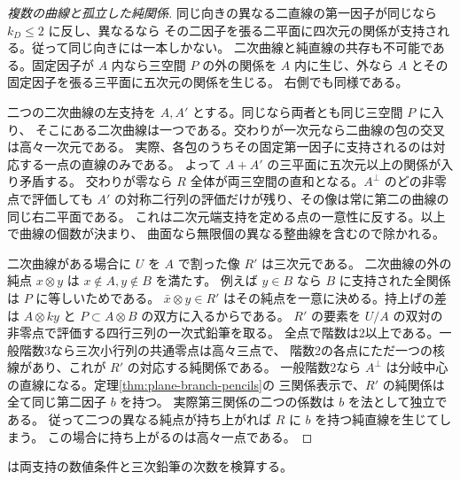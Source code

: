 \begin{proof}[複数の曲線と孤立した純関係]
同じ向きの異なる二直線の第一因子が同じなら $k_D\le2$ に反し、異なるなら
その二因子を張る二平面に四次元の関係が支持される。従って同じ向きには一本しかない。
二次曲線と純直線の共存も不可能である。固定因子が $A$ 内なら三空間 $P$ の外の関係を
$A$ 内に生じ、外なら $A$ とその固定因子を張る三平面に五次元の関係を生じる。
右側でも同様である。

二つの二次曲線の左支持を $A,A'$ とする。同じなら両者とも同じ三空間 $P$ に入り、
そこにある二次曲線は一つである。交わりが一次元なら二曲線の包の交叉は高々一次元である。
実際、各包のうちその固定第一因子に支持されるのは対応する一点の直線のみである。
よって $A+A'$ の三平面に五次元以上の関係が入り矛盾する。
交わりが零なら $R$ 全体が両三空間の直和となる。$A^\perp$ のどの非零点で評価しても
$A'$ の対称二行列の評価だけが残り、その像は常に第二の曲線の同じ右二平面である。
これは二次元端支持を定める点の一意性に反する。以上で曲線の個数が決まり、
曲面なら無限個の異なる整曲線を含むので除かれる。

二次曲線がある場合に $U$ を $A$ で割った像 $R'$ は三次元である。
二次曲線の外の純点 $x\otimes y$ は $x\notin A,y\notin B$ を満たす。
例えば $y\in B$ なら $B$ に支持された全関係は $P$ に等しいためである。
$\bar x\otimes y\in R'$ はその純点を一意に決める。持上げの差は $A\otimes ky$ と
$P\subset A\otimes B$ の双方に入るからである。
$R'$ の要素を $U/A$ の双対の非零点で評価する四行三列の一次式鉛筆を取る。
全点で階数は2以上である。一般階数3なら三次小行列の共通零点は高々三点で、
階数2の各点にただ一つの核線があり、これが $R'$ の対応する純関係である。
一般階数2なら $A^\perp$ は分岐中心の直線になる。定理\ref{thm:plane-branch-pencils}の
三関係表示で、$R'$ の純関係は全て同じ第二因子 $b$ を持つ。
実際第三関係の二つの係数は $b$ を法として独立である。
従って二つの異なる純点が持ち上がれば $R$ に $b$ を持つ純直線を生じてしまう。
この場合に持ち上がるのは高々一点である。
\end{proof}
は両支持の数値条件と三次鉛筆の次数を検算する。
